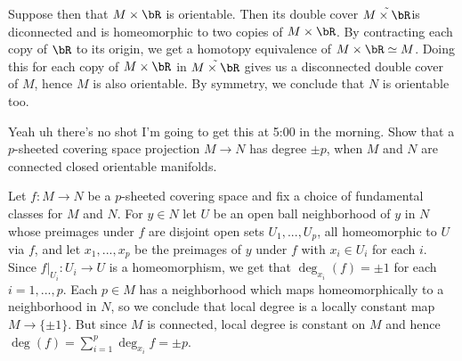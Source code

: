 \begin{homework}[e]
\begin{prf}
    Suppose then that $M\times \bR$ is orientable. Then its double cover $\tilde{M\times \bR}$is diconnected and is homeomorphic to two copies of $M\times \bR$. By contracting each copy of $\bR$ to its origin, we get a homotopy equivalence of $M\times \bR \simeq M$. Doing this for each copy of $M\times \bR$ in $\tilde{M\times \bR}$ gives us a disconnected double cover of $M$, hence $M$ is also orientable. By symmetry, we conclude that $N$ is orientable too.
  \end{prf}
   Yeah uh there's no shot I'm going to get this at 5:00 in the morning.
   Show that a $p$-sheeted covering space projection $M\to N$ has degree $\pm p$, when $M$ and $N$ are connected closed orientable manifolds.
  \begin{prf}
    Let $f:M\to N$ be a $p$-sheeted covering space and fix a choice of fundamental classes for $M$ and $N$. For $y \in N$ let $U$ be an open ball neighborhood of $y$ in $N$ whose preimages under $f$ are disjoint open sets $U_1,...,U_p$, all homeomorphic to $U$ via $f$, and let $x_1,...,x_p$ be the preimages of $y$ under $f$ with $x_i \in U_i$ for each $i$. Since $f|_{U_i}:U_i\to U$ is a homeomorphism, we get that $\deg_{x_i}(f) = \pm 1$ for each $i = 1,...,p$. Each $p \in M$ has a neighborhood which maps homeomorphically to a neighborhood in $N$, so we conclude that local degree is a locally constant map $M\to \{\pm 1\}$. But since $M$ is connected, local degree is constant on $M$ and hence $\deg(f) = \sum_{i=1}^p \deg_{x_i}f = \pm p$.
  \end{prf}
\end{homework} 

